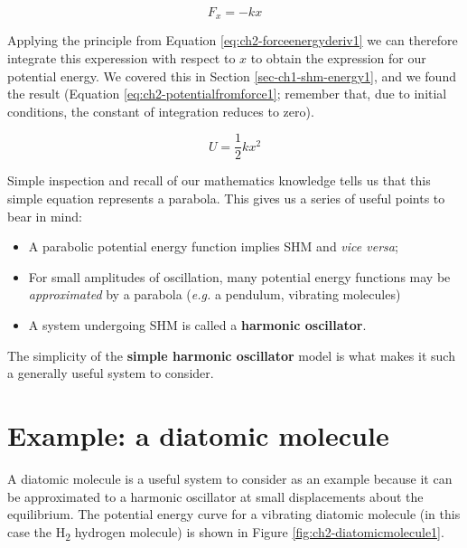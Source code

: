 \documentclass[
]{book}
\providecommand{\tightlist}{%
  \setlength{\itemsep}{0pt}\setlength{\parskip}{0pt}}
\begin{document}
\begin{equation}
F_x = -kx
\label{eq:ch2-hookeslaw1}
\end{equation}

Applying the principle from Equation \eqref{eq:ch2-forceenergyderiv1} we can therefore integrate this experession with respect to \(x\) to obtain the expression for our potential energy. We covered this in Section \ref{sec-ch1-shm-energy1}, and we found the result (Equation \eqref{eq:ch2-potentialfromforce1}; remember that, due to initial conditions, the constant of integration reduces to zero).

\begin{equation}
U  = \frac{1}{2}kx^2 
\label{eq:ch2-potentialfromforce1}
\end{equation}

Simple inspection and recall of our mathematics knowledge tells us that this simple equation represents a parabola. This gives us a series of useful points to bear in mind:

\begin{itemize}
\tightlist
\item
  A parabolic potential energy function implies SHM and \emph{vice versa};
\item
  For small amplitudes of oscillation, many potential energy functions may be \emph{approximated} by a parabola (\emph{e.g.} a pendulum, vibrating molecules)
\item
  A system undergoing SHM is called a \textbf{harmonic oscillator}.
\end{itemize}

The simplicity of the \textbf{simple harmonic oscillator} model is what makes it such a generally useful system to consider.

\hypertarget{sec-ch2-diatomicmolecule}{%
\section{Example: a diatomic molecule}\label{sec-ch2-diatomicmolecule}}

A diatomic molecule is a useful system to consider as an example because it can be approximated to a harmonic oscillator at small displacements about the equilibrium. The potential energy curve for a vibrating diatomic molecule (in this case the H\textsubscript{2} hydrogen molecule) is shown in Figure \ref{fig:ch2-diatomicmolecule1}.
\end{document}

